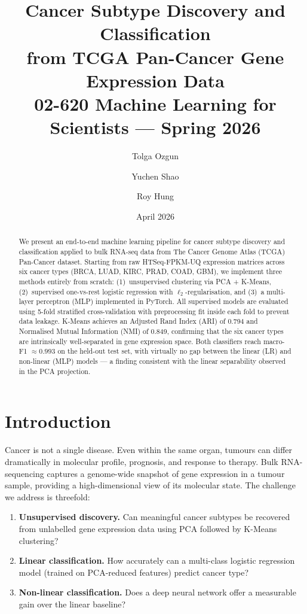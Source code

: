 \documentclass[11pt,letterpaper]{article}
\title{%
  \Large\textbf{Cancer Subtype Discovery and Classification}\\[4pt]
  \large from TCGA Pan-Cancer Gene Expression Data\\[6pt]
  \normalsize 02-620 Machine Learning for Scientists --- Spring 2026
}
\author{Tolga Ozgun \and Yuchen Shao \and Roy Hung}
\date{April 2026}
\begin{document}
\maketitle

\begin{abstract}
We present an end-to-end machine learning pipeline for cancer subtype discovery
and classification applied to bulk RNA-seq data from The Cancer Genome Atlas
(TCGA) Pan-Cancer dataset.  Starting from raw HTSeq-FPKM-UQ expression
matrices across six cancer types (BRCA, LUAD, KIRC, PRAD, COAD, GBM), we
implement three methods entirely from scratch: (1)~unsupervised clustering via
PCA + K-Means, (2)~supervised one-vs-rest logistic regression with
$\ell_2$-regularisation, and (3)~a multi-layer perceptron (MLP) implemented
in PyTorch.  All supervised models are evaluated using 5-fold stratified
cross-validation with preprocessing fit inside each fold to prevent data
leakage.  K-Means achieves an Adjusted Rand Index (ARI) of 0.794 and
Normalised Mutual Information (NMI) of 0.849, confirming that the six cancer
types are intrinsically well-separated in gene expression space.  Both
classifiers reach macro-F1 $\approx 0.993$ on the held-out test set, with
virtually no gap between the linear (LR) and non-linear (MLP) models --- a
finding consistent with the linear separability observed in the PCA projection.
\end{abstract}

\section{Introduction}
\label{sec:intro}

Cancer is not a single disease.  Even within the same organ, tumours can differ
dramatically in molecular profile, prognosis, and response to therapy.  Bulk
RNA-sequencing captures a genome-wide snapshot of gene expression in a tumour
sample, providing a high-dimensional view of its molecular state.  The challenge
we address is threefold:

\begin{enumerate}[leftmargin=2em,itemsep=1pt]
  \item \textbf{Unsupervised discovery.}  Can meaningful cancer subtypes be
        recovered from unlabelled gene expression data using PCA followed by
        K-Means clustering?
  \item \textbf{Linear classification.}  How accurately can a multi-class
        logistic regression model (trained on PCA-reduced features) predict
        cancer type?
  \item \textbf{Non-linear classification.}  Does a deep neural network offer
        a measurable gain over the linear baseline?
\end{enumerate}
\end{document}
